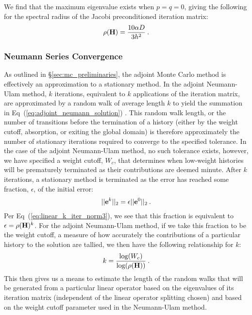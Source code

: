 We find that the maximum eigenvalue exists when $p=q=0$, giving the
following for the spectral radius of the Jacobi preconditioned
iteration matrix:
\begin{equation}
  \rho(\mathbf{H}) = \frac{10 \alpha D}{3 h^2}\:.
  \label{eq:iteration_radius}
\end{equation}

\subsubsection{Neumann Series Convergence}
\label{subsec:neumann_convergence}
As outlined in \S\ref{sec:mc_preliminaries}, the adjoint Monte Carlo
method is effectively an approximation to a stationary method. In the
adjoint Neumann-Ulam method, $k$ iterations, equivalent to $k$
applications of the iteration matrix, are approximated by a random
walk of average length $k$ to yield the summation in
Eq~(\ref{eq:adjoint_neumann_solution})
\citep{dimov_new_1998,danilov_asymptotic_2000}. This random walk
length, or the number of transitions before the termination of a
history (either by the weight cutoff, absorption, or exiting the
global domain) is therefore approximately the number of stationary
iterations required to converge to the specified tolerance. In the
case of the adjoint Neumann-Ulam method, no such tolerance exists,
however, we have specified a weight cutoff, $W_c$, that determines
when low-weight histories will be prematurely terminated as their
contributions are deemed minute. After $k$ iterations, a stationary
method is terminated as the error has reached some fraction,
$\epsilon$, of the initial error:
\begin{equation}
  ||\mathbf{e}^{k}||_2 = \epsilon ||\mathbf{e}^0||_2\:.
  \label{eq:linear_k_iter_norm4}
\end{equation}
Per Eq~(\ref{eq:linear_k_iter_norm3}), we see that this fraction is
equivalent to $\epsilon = \rho(\mathbf{H})^k$. For the adjoint
Neumann-Ulam method, if we take this fraction to be the weight cutoff,
a measure of how accurately the contributions of a particular history
to the solution are tallied, we then have the following relationship
for $k$:
\begin{equation}
  k = \frac{ \log(W_c) }{ \log( \rho(\mathbf{H}) ) }\:.
  \label{eq:analytic_k}
\end{equation}
This then gives us a means to estimate the length of the random walks
that will be generated from a particular linear operator based on the
eigenvalues of its iteration matrix (independent of the linear
operator splitting chosen) and based on the weight cutoff parameter
used in the Neumann-Ulam method.

